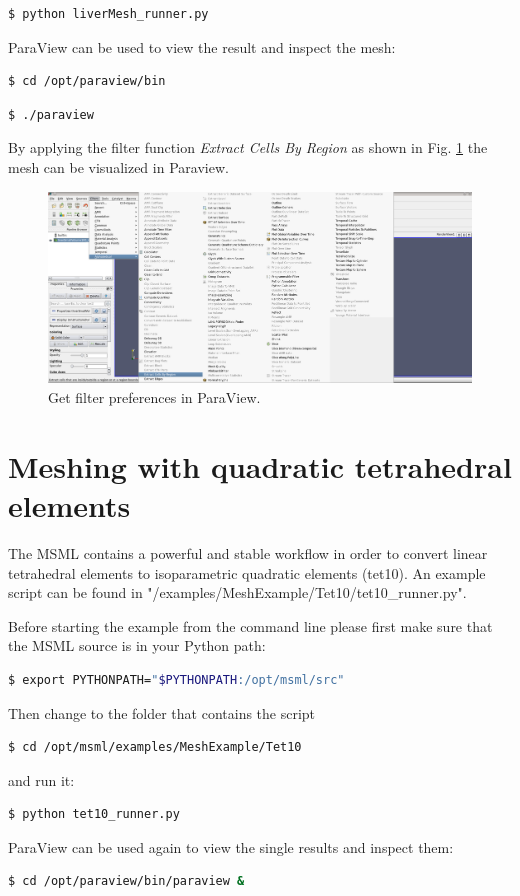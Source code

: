\begin{lstlisting}[language=sh, breaklines=true]
$ python liverMesh_runner.py
\end{lstlisting}

ParaView can be used to view the result and inspect the mesh:
\begin{lstlisting}[language=sh, breaklines=true]
$ cd /opt/paraview/bin
\end{lstlisting}
\begin{lstlisting}[language=sh, breaklines=true]
$ ./paraview
\end{lstlisting}

By applying the filter function \emph{Extract Cells By Region} as shown in Fig. \ref{ParaviewFilterScreenshot} the mesh can be visualized in Paraview. 

\begin{figure}[h]
  	\centering
    \includegraphics[width=\textwidth]{pictures/paraview_filter.png}
    \caption{Get filter preferences in ParaView.}
    \label{ParaviewFilterScreenshot}
\end{figure}

\newpage

\section{Meshing with quadratic tetrahedral elements}
The MSML contains a powerful and stable workflow in order to convert linear tetrahedral elements to isoparametric quadratic elements (tet10). An example script can be found in "/examples/MeshExample/Tet10/tet10\_runner.py".

Before starting the example from the command line please first make sure that the MSML source is in your Python path:
\begin{lstlisting}[language=sh, breaklines=true]
$ export PYTHONPATH="$PYTHONPATH:/opt/msml/src"
\end{lstlisting}

Then change to the folder that contains the script
\begin{lstlisting}[language=sh, breaklines=true]
$ cd /opt/msml/examples/MeshExample/Tet10
\end{lstlisting}

and run it:
\begin{lstlisting}[language=sh, breaklines=true]
$ python tet10_runner.py
\end{lstlisting}

ParaView can be used again to view the single results and inspect them:
\begin{lstlisting}[language=sh, breaklines=true]
$ cd /opt/paraview/bin/paraview &
\end{lstlisting}